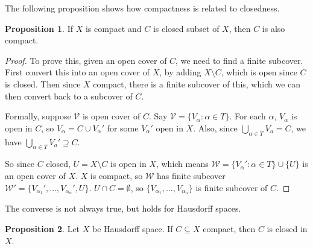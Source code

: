 \documentclass[a4paper,11pt]{article}
\theoremstyle{definition}
\newtheorem*{prop}{Proposition}
\numberwithin{equation}{section}
\begin{document}
The following proposition shows how compactness is related to closedness.

\begin{prop}
    If $X$ is compact and $C$ is closed subset of $X$, then $C$ is also compact.
\end{prop}

\begin{proof}
    To prove this, given an open cover of $C$, we need to find a finite subcover. First convert this into an open cover of $X$, by adding $X\setminus C$, which is open since $C$ is closed. Then since $X$ compact, there is a finite subcover of this, which we can then convert back to a subcover of $C$.
    
    Formally, suppose $\mathcal{V}$ is open cover of $C$. Say $\mathcal{V}=\{V_\alpha:\alpha\in T\}$. For each $\alpha$, $V_\alpha$ is open in $C$, so $V_\alpha=C\cup V_\alpha'$ for some $V_\alpha'$ open in $X$. Also, since $\bigcup_{\alpha\in T}V_a=C$, we have $\bigcup_{\alpha\in T}V_a'\supseteq C$.
    
    So since $C$ closed, $U=X\setminus C$ is open in $X$, which means $\mathcal{W}=\{V_\alpha':\alpha\in T\}\cup\{U\}$ is an open cover of $X$. $X$ is compact, so $\mathcal{W}$ has finite subcover $\mathcal{W}'=\{V_{\alpha_1}',...,V_{\alpha_n}',U\}$. $U\cap C=\emptyset$, so $\{V_{\alpha_1},...,V_{\alpha_n}\}$ is finite subcover of $C$.
\end{proof}

The converse is not always true, but holds for Hausdorff spaces.

\begin{prop}
    Let $X$ be Hausdorff space. If $C\subseteq X$ compact, then $C$ is closed in $X$.
\end{prop}
\end{document}
